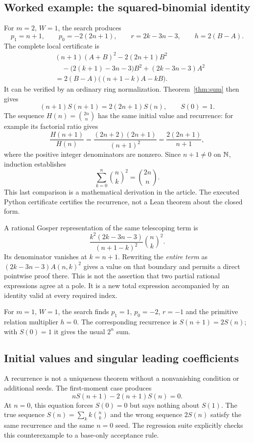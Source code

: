 \subsection{Worked example: the squared-binomial identity}
\label{sec:binomial-square}

For $m=2$, $W=1$, the search produces
\[
 p_1=n+1,\qquad p_0=-2(2n+1),\qquad r=2k-3n-3,
 \qquad h=2(B-A).
\]
The complete local certificate is
\begin{align*}
 &(n+1)(A+B)^2-2(2n+1)B^2\\
 &\quad-\bigl(2(k+1)-3n-3\bigr)B^2
       +(2k-3n-3)A^2\\
 &=2(B-A)\bigl((n+1-k)A-kB\bigr).
\end{align*}
It can be verified by an ordinary ring normalization. Theorem~\ref{thm:sum}
then gives
\[
 (n+1)S(n+1)=2(2n+1)S(n),\qquad S(0)=1.
\]
The sequence $H(n)=\binom{2n}{n}$ has the same initial value and recurrence:
for example its factorial ratio gives
\[
 \frac{H(n+1)}{H(n)}=
 \frac{(2n+2)(2n+1)}{(n+1)^2}
 =\frac{2(2n+1)}{n+1},
\]
where the positive integer denominators are nonzero. Since $n+1\ne0$ on
$\mathbb N$, induction establishes
\[
 \boxed{\displaystyle\sum_{k=0}^n\binom nk^2=\binom{2n}{n}.}
\]
This last comparison is a mathematical derivation in the article. The executed
Python certificate certifies the recurrence, not a Lean theorem about the closed
form.

A rational Gosper representation of the same telescoping term is
\[
 \frac{k^2(2k-3n-3)}{(n+1-k)^2}\binom nk^2.
\]
Its denominator vanishes at $k=n+1$. Rewriting the \emph{entire term} as
$(2k-3n-3)A(n,k)^2$ gives a value on that boundary and permits a direct pointwise
proof there. This is not the assertion that two partial rational expressions
agree at a pole. It is a new total expression accompanied by an identity valid
at every required index.

For $m=1$, $W=1$, the search finds $p_1=1$, $p_0=-2$, $r=-1$ and the primitive
relation multiplier $h=0$. The corresponding recurrence is $S(n+1)=2S(n)$;
with $S(0)=1$ it gives the usual $2^n$ sum.

\subsection{Initial values and singular leading coefficients}
\label{sec:singular}

A recurrence is not a uniqueness theorem without a nonvanishing condition or
additional seeds. The first-moment case produces
\[
 nS(n+1)-2(n+1)S(n)=0.
\]
At $n=0$, this equation forces $S(0)=0$ but says nothing about $S(1)$. The true
sequence $S(n)=\sum_k k\binom nk$ and the wrong sequence $2S(n)$ satisfy the
same recurrence and the same $n=0$ seed. The regression suite explicitly checks
this counterexample to a base-only acceptance rule.

